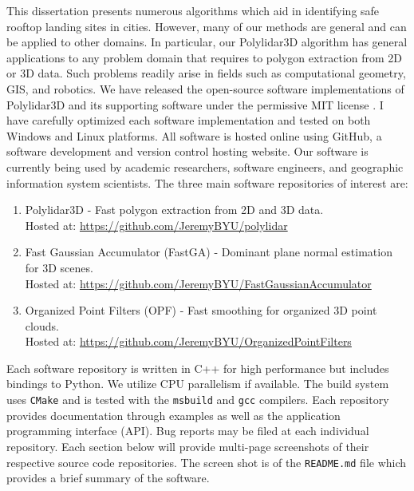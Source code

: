 This dissertation presents numerous algorithms which aid in identifying safe rooftop landing sites in cities. However, many of our methods are general and can be applied to other domains. In particular, our Polylidar3D algorithm has general applications to any problem domain that requires to polygon extraction from 2D or 3D data. Such problems readily arise in fields such as computational geometry, \ac{GIS}, and robotics. We have released the open-source software implementations of Polylidar3D and its supporting software under the permissive MIT license \cite{saltzer_origin_2020}. I have carefully optimized each software implementation and tested on both Windows and Linux platforms. All software is hosted online using GitHub, a software development and version control hosting website. Our software is currently being used by academic researchers, software engineers, and geographic information system scientists.  The three main software repositories of interest are:

\begin{enumerate}
    \item Polylidar3D - Fast polygon extraction from 2D and 3D data. \\ Hosted at: \url{https://github.com/JeremyBYU/polylidar}
    \item Fast Gaussian Accumulator (FastGA) - Dominant plane normal estimation for 3D scenes. \\  Hosted at: \url{https://github.com/JeremyBYU/FastGaussianAccumulator}
    \item Organized Point Filters (OPF) - Fast smoothing for organized 3D point clouds.
    \\  Hosted at: \url{https://github.com/JeremyBYU/OrganizedPointFilters}
\end{enumerate}

Each software repository is written in C++ for high performance but includes bindings to Python. We utilize CPU parallelism if available. The build system uses \texttt{CMake} and is tested with the \texttt{msbuild} and \texttt{gcc} compilers. Each repository provides documentation through examples as well as the application programming interface (API). Bug reports may be filed at each individual repository. Each section below will provide multi-page screenshots of their respective source code repositories. The screen shot is of the \texttt{README.md} file which provides a brief summary of the software.






